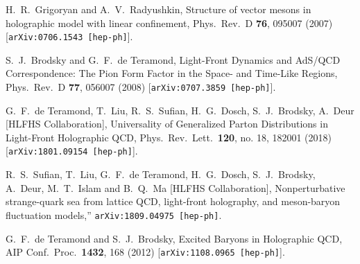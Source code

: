 \documentclass[12pt]{article}
\begin{document}
\begin{thebibliography}{50}

  H.~R.~Grigoryan and A.~V.~Radyushkin,
  Structure of vector mesons in holographic model with linear confinement,
  Phys.\ Rev.\ D {\bf 76}, 095007 (2007)
  [{\tt arXiv:0706.1543 [hep-ph]}].
  
 
  S.~J.~Brodsky and G.~F.~de Teramond,
  Light-Front Dynamics and AdS/QCD Correspondence: The Pion Form Factor in the Space- and Time-Like Regions,
  Phys.\ Rev.\ D {\bf 77}, 056007 (2008)
  [{\tt arXiv:0707.3859 [hep-ph]}]. 
  
  
   G.~F.~de Teramond,  T.~Liu, R.~S.~Sufian, H.~G.~Dosch, S.~J.~Brodsky, A.~Deur  [HLFHS Collaboration],
  Universality of Generalized Parton Distributions in Light-Front Holographic QCD,
  Phys.\ Rev.\ Lett.\  {\bf 120}, no. 18, 182001 (2018)
  [{\tt arXiv:1801.09154 [hep-ph]}].  
  

  R.~S.~Sufian, T.~Liu, G.~F.~de Teramond, H.~G.~Dosch, S.~J.~Brodsky, A.~Deur, M.~T.~Islam and B.~Q.~Ma [HLFHS Collaboration],
  Nonperturbative strange-quark sea from lattice QCD, light-front holography, and meson-baryon fluctuation models,''
 {\tt  arXiv:1809.04975 [hep-ph]}.


  G.~F.~de Teramond and S.~J.~Brodsky,
  Excited Baryons in Holographic QCD,
  AIP Conf.\ Proc.\  {\bf 1432}, 168 (2012)
 [{\tt arXiv:1108.0965 [hep-ph]}].

\end{thebibliography}
\end{document}
